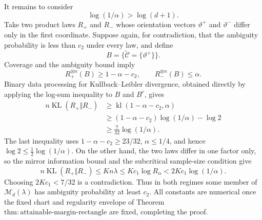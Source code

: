 It remains to consider
\[
\log(1/\alpha)>\log(d+1).
\]
Take two product laws \(R_+\) and \(R_-\) whose orientation vectors \(\vartheta^+\) and \(\vartheta^-\) differ only in the first coordinate.  Suppose again, for contradiction, that the ambiguity probability is less than \(c_2\) under every law, and define
\[
B=\{\widetilde{\mathcal C}=\{\vartheta^+\}\}.
\]
Coverage and the ambiguity bound imply
\[
R_+^{\otimes n}(B)\ge1-\alpha-c_2,\qquad
R_-^{\otimes n}(B)\le\alpha.
\]
Binary data processing for Kullback--Leibler divergence, obtained directly by applying the log-sum inequality to \(B\) and \(B^c\), gives
\[
\begin{aligned}
n\operatorname{KL}(R_+\Vert R_-)
&\ge \operatorname{kl}(1-\alpha-c_2,\alpha)\\
&\ge(1-\alpha-c_2)\log(1/\alpha)-\log2\\
&\ge\frac7{32}\log(1/\alpha).
\end{aligned}
\]
The last inequality uses \(1-\alpha-c_2\ge23/32\), \(\alpha\le1/4\), and hence \(\log2\le\frac12\log(1/\alpha)\).  On the other hand, the two laws differ in one factor only, so the mirror information bound and the subcritical sample-size condition give
\[
n\operatorname{KL}(R_+\Vert R_-)\le Kn\lambda
\le Kc_1\log R_\alpha<2Kc_1\log(1/\alpha).
\]
Choosing \(2Kc_1<7/32\) is a contradiction.  Thus in both regimes some member of \(\mathcal M_d(\lambda)\) has ambiguity probability at least \(c_2\).  All constants are numerical once the fixed chart and regularity envelope of Theorem \(\mathrm{thm:attainable\text{-}margin\text{-}rectangle}\) are fixed, completing the proof.

